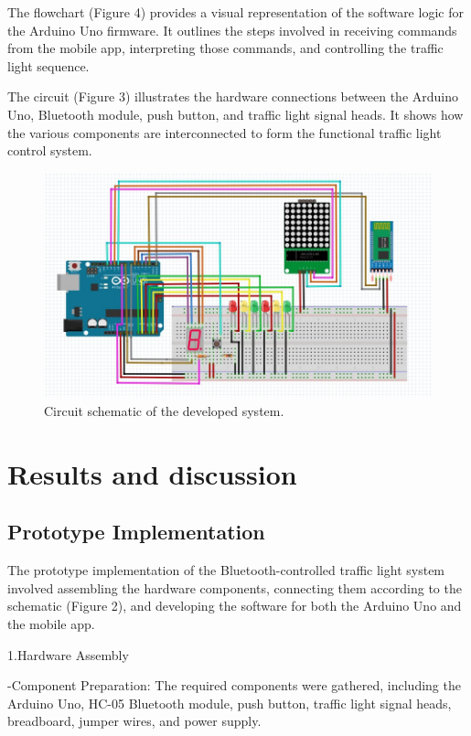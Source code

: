 \documentclass[conference, onecolumn]{IEEEtran}
\begin{document}
The flowchart (Figure 4) provides a visual representation of the software logic for the Arduino Uno firmware. It outlines the steps involved in receiving commands from the mobile app, interpreting those commands, and controlling the traffic light sequence.\par

The circuit (Figure 3) illustrates the hardware connections between the Arduino Uno, Bluetooth module, push button, and traffic light signal heads. It shows how the various components are interconnected to form the functional traffic light control system.\par

\begin{figure}[htbp]
\centerline{\includegraphics[width=7 in]{circuit.jpg}}
\caption{Circuit schematic of the developed system.}
\label{fig}
\end{figure}



\section{Results and discussion}

\subsection{Prototype Implementation}
The prototype implementation of the Bluetooth-controlled traffic light system involved assembling the hardware components, connecting them according to the schematic (Figure 2), and developing the software for both the Arduino Uno and the mobile app.

1.Hardware Assembly

-Component Preparation: The required components were gathered, including the Arduino Uno, HC-05 Bluetooth module, push button, traffic light signal heads, breadboard, jumper wires, and power supply.\par
\end{document}
